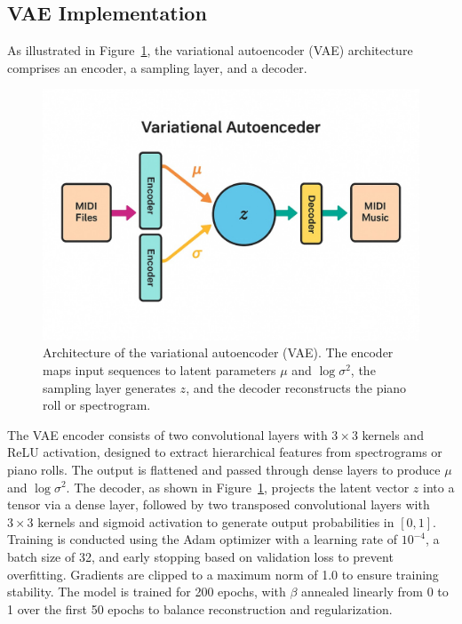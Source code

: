 \documentclass[conference]{IEEEtran}
\begin{document}
\subsection{VAE Implementation}
As illustrated in Figure~\ref{fig:vae_arch}, the variational autoencoder (VAE) architecture comprises an encoder, a sampling layer, and a decoder.
\begin{figure}[h]
    \centering
    \includegraphics[width=\linewidth]{vae_architecture.jpg}
    \caption{Architecture of the variational autoencoder (VAE). The encoder maps input sequences to latent parameters $\mu$ and $\log\sigma^2$, the sampling layer generates $z$, and the decoder reconstructs the piano roll or spectrogram.}
    \label{fig:vae_arch}
\end{figure}

The VAE encoder consists of two convolutional layers with $3 \times 3$ kernels and ReLU activation, designed to extract hierarchical features from spectrograms or piano rolls. The output is flattened and passed through dense layers to produce $\mu$ and $\log\sigma^2$. The decoder, as shown in Figure~\ref{fig:vae_arch}, projects the latent vector $z$ into a tensor via a dense layer, followed by two transposed convolutional layers with $3 \times 3$ kernels and sigmoid activation to generate output probabilities in $[0, 1]$. Training is conducted using the Adam optimizer with a learning rate of $10^{-4}$, a batch size of 32, and early stopping based on validation loss to prevent overfitting. Gradients are clipped to a maximum norm of 1.0 to ensure training stability. The model is trained for 200 epochs, with $\beta$ annealed linearly from 0 to 1 over the first 50 epochs to balance reconstruction and regularization.
\end{document}
